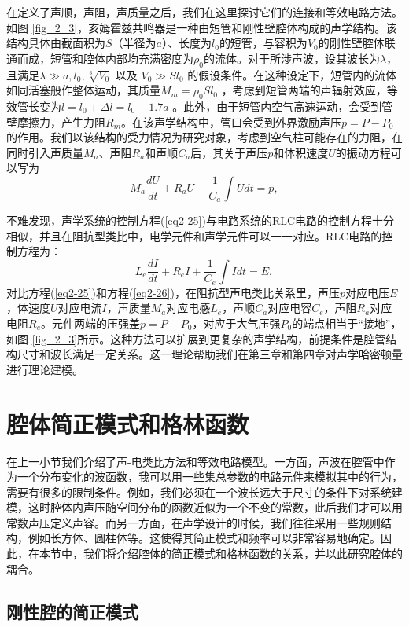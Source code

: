 在定义了声顺，声阻，声质量之后，我们在这里探讨它们的连接和等效电路方法。如图 \ref{fig_2_3}，亥姆霍兹共鸣器是一种由短管和刚性壁腔体构成的声学结构。该结构具体由截面积为$S$（半径为$a$）、长度为$l_0$的短管，与容积为$V_0$的刚性壁腔体联通而成，短管和腔体内部均充满密度为$\rho_0$的流体。对于所涉声波，设其波长为$\lambda$，且满足$\lambda \gg a, l_0, \sqrt[3]{V_0}$ 以及 $V_0 \gg Sl_0$ 的假设条件。在这种设定下，短管内的流体如同活塞般作整体运动，其质量$M_m = \rho_0Sl_0$ ，考虑到短管两端的声辐射效应，等效管长变为$l = l_0 + \Delta l =  l_0 + 1.7a$ 。此外，由于短管内空气高速运动，会受到管壁摩擦力，产生力阻$R_m$。在该声学结构中，管口会受到外界激励声压$p = P - P_0$的作用。我们以该结构的受力情况为研究对象，考虑到空气柱可能存在的力阻，在同时引入声质量$M_a$、声阻$R_a$和声顺$C_a$后，其关于声压$p$和体积速度$U$的振动方程可以写为
\begin{equation}\label{eq2-25}
  M_a\frac{dU}{dt} + R_aU + \frac{1}{C_a}\int Udt = p,
\end{equation}

不难发现，声学系统的控制方程(\ref{eq2-25})与电路系统的RLC电路的控制方程十分相似，并且在阻抗型类比中，电学元件和声学元件可以一一对应。RLC电路的控制方程为：
\begin{equation}\label{eq2-26}
  L_e\frac{dI}{dt} + R_eI + \frac{1}{C_e}\int Idt = E,
\end{equation}
对比方程(\ref{eq2-25})和方程(\ref{eq2-26})，在阻抗型声电类比关系里，声压$p$对应电压$E$，体速度$U$对应电流$I$，声质量$M_a$对应电感$L_e$，声顺$C_a$对应电容$C_e$，声阻$R_a$对应电阻$R_e$。元件两端的压强差$p = P - P_0$，对应于大气压强$P_0$的端点相当于“接地”，如图 \ref{fig_2_3}所示。这种方法可以扩展到更复杂的声学结构，前提条件是腔管结构尺寸和波长满足一定关系。这一理论帮助我们在第三章和第四章对声学哈密顿量进行理论建模。

 \section{腔体简正模式和格林函数}
 在上一小节我们介绍了声-电类比方法和等效电路模型。一方面，声波在腔管中作为一个分布变化的波函数，我可以用一些集总参数的电路元件来模拟其中的行为，需要有很多的限制条件。例如，我们必须在一个波长远大于尺寸的条件下对系统建模，这时腔体内声压随空间分布的函数近似为一个不变的常数，此后我们才可以用常数声压定义声容。而另一方面，在声学设计的时候，我们往往采用一些规则结构，例如长方体、圆柱体等。这使得其简正模式和频率可以非常容易地确定。因此，在本节中，我们将介绍腔体的简正模式和格林函数的关系，并以此研究腔体的耦合。

\subsection{刚性腔的简正模式}

